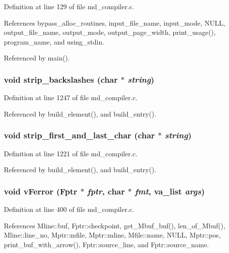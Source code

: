 Definition at line 129 of file md\_\-compiler.c.

References bypass\_\-alloc\_\-routines, input\_\-file\_\-name, input\_\-mode, NULL, output\_\-file\_\-name, output\_\-mode, output\_\-page\_\-width, print\_\-usage(), program\_\-name, and using\_\-stdin.

Referenced by main().
\subsubsection{\setlength{\rightskip}{0pt plus 5cm}void strip\_\-backslashes (char $\ast$ {\em string})}\label{md__compiler_8c_6c965136793f17f282274459e488269a}




Definition at line 1247 of file md\_\-compiler.c.

Referenced by build\_\-element(), and build\_\-entry().
\subsubsection{\setlength{\rightskip}{0pt plus 5cm}void strip\_\-first\_\-and\_\-last\_\-char (char $\ast$ {\em string})}\label{md__compiler_8c_ba55bcbd6888bc153c67816b6bbf34a5}




Definition at line 1221 of file md\_\-compiler.c.

Referenced by build\_\-element(), and build\_\-entry().
\subsubsection{\setlength{\rightskip}{0pt plus 5cm}void v\-Ferror (\bf{Fptr} $\ast$ {\em fptr}, char $\ast$ {\em fmt}, va\_\-list {\em args})}\label{md__compiler_8c_d52c3f1409f7b9a5f521e34fa8c866a3}




Definition at line 400 of file md\_\-compiler.c.

References Mline::buf, Fptr::checkpoint, get\_\-Mbuf\_\-buf(), len\_\-of\_\-Mbuf(), Mline::line\_\-no, Mptr::mfile, Mptr::mline, Mfile::name, NULL, Mptr::pos, print\_\-buf\_\-with\_\-arrow(), Fptr::source\_\-line, and Fptr::source\_\-name.


